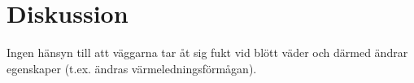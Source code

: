 \chapter{Diskussion}


Ingen hänsyn till att väggarna tar åt sig fukt vid blött väder och därmed ändrar egenskaper (t.ex. ändras värmeledningsförmågan).








